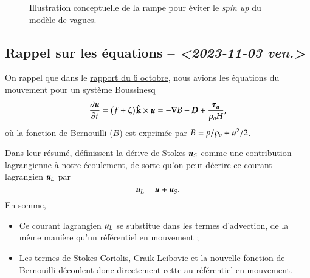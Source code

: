 \documentclass[10pt]{article}
\numberwithin{equation}{section}
\newcommand{\kvf}{\vb{\hat{k}}}
\newcommand{\uu}{\vb*{u}}
\newcommand{\pt}{\hspace{1pt}} %
\begin{document}
\begin{figure}
\begin{center}
\end{center}
\caption{\label{org4519fd8}Illustration conceptuelle de la rampe pour éviter le \emph{spin up} du modèle de vagues.}
\end{figure}

\subsection{Rappel sur les équations -- \textit{<2023-11-03 ven.>}}
\label{sec:org558001a}

On rappel que dans le \href{rapport-2023-10-06.org}{rapport du 6 octobre}, nous avions les équations du mouvement pour un système Boussinesq
\begin{equation}
\label{eq:orgb0adb00}
   \pdv{\uu}{t} = \qty(f+\zeta)\pt \kvf\times\uu = -\gradient{B} + \boldsymbol{D} + \frac{\boldsymbol{\tau_a}}{\rho_o H},
\end{equation}
où la fonction de Bernouilli (\(B\)) est exprimée par \(B = p/\rho_o + \uu^2/2\).\bigskip


Dans leur résumé,   définissent la dérive de Stokes \(\uu_S\) comme une contribution lagrangienne à notre écoulement, de sorte qu'on peut décrire ce courant lagrangien \(\uu_L\) par
\begin{equation}
   \uu_L = \uu + \uu_S.
\end{equation}
En somme, 
\begin{itemize}
\item Ce courant lagrangien \(\uu_L\) se substitue dans les termes d'advection, de la même manière qu'un référentiel en mouvement ;
\item Les termes de Stokes-Coriolis, Craik-Leibovic et la nouvelle fonction de Bernouilli découlent donc directement cette au référentiel en mouvement. \bigskip
\end{itemize}
\end{document}
